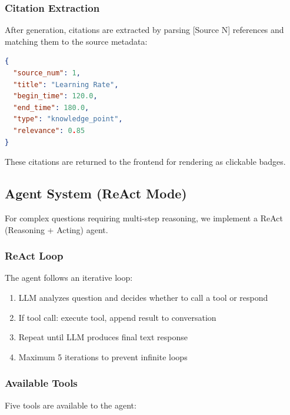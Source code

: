 \documentclass[12pt,a4paper]{article}
\begin{document}
\subsubsection{Citation Extraction}

After generation, citations are extracted by parsing [Source N] references and matching them to the source metadata:

\begin{lstlisting}[language=json, caption={Citation Structure}]
{
  "source_num": 1,
  "title": "Learning Rate",
  "begin_time": 120.0,
  "end_time": 180.0,
  "type": "knowledge_point",
  "relevance": 0.85
}
\end{lstlisting}

These citations are returned to the frontend for rendering as clickable badges.

\subsection{Agent System (ReAct Mode)}

For complex questions requiring multi-step reasoning, we implement a ReAct (Reasoning + Acting) agent.

\subsubsection{ReAct Loop}

The agent follows an iterative loop:

\begin{enumerate}
    \item LLM analyzes question and decides whether to call a tool or respond
    \item If tool call: execute tool, append result to conversation
    \item Repeat until LLM produces final text response
    \item Maximum 5 iterations to prevent infinite loops
\end{enumerate}

\subsubsection{Available Tools}

Five tools are available to the agent:
\end{document}
